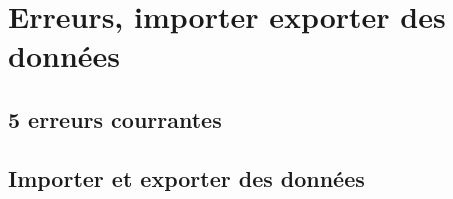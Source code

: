 \section{Erreurs, importer exporter des données}
\subsection{5 erreurs courrantes}

\subsection{Importer et exporter des données}

